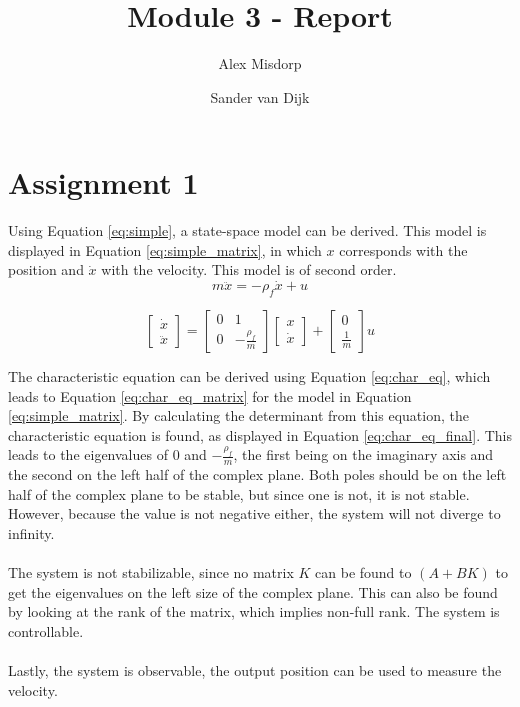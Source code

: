 \documentclass[final]{scrreprt} %
\title{Module 3 - Report}
\author{Alex {Misdorp} \and Sander {van Dijk}}
\begin{document}
\chapter{Assignment 1}
Using Equation \ref{eq:simple}, a state-space model can be derived. This model is displayed in Equation \ref{eq:simple_matrix}, in which $x$ corresponds with the position and $\dot{x}$ with the velocity. This model is of second order.
\begin{equation}
	m \ddot{x} = -\rho_f \dot{x} + u
	\label{eq:simple}
\end{equation}

\begin{equation}
	\begin{bmatrix}
		\dot{x} \\
		\ddot{x}
	\end{bmatrix} =
	\begin{bmatrix}
		0 & 1 \\
		0 & -\frac{\rho_f}{m}
	\end{bmatrix}
	\begin{bmatrix}
		x \\
		\dot{x}
	\end{bmatrix} +
	\begin{bmatrix}
		0 \\
		\frac{1}{m}
	\end{bmatrix}
	u
	\label{eq:simple_matrix}
\end{equation}

The characteristic equation can be derived using Equation \ref{eq:char_eq}, which leads to Equation \ref{eq:char_eq_matrix} for the model in Equation \ref{eq:simple_matrix}. By calculating the determinant from this equation, the characteristic equation is found, as displayed in Equation \ref{eq:char_eq_final}. This leads to the eigenvalues of $0$ and $-\frac{\rho_f}{m}$, the first being on the imaginary axis and the second on the left half of the complex plane. Both poles should be on the left half of the complex plane to be stable, but since one is not, it is not stable. However, because the value is not negative either, the system will not diverge to infinity.
\\ \\
The system is not stabilizable, since no matrix $K$ can be found to $(A + BK)$ to get the eigenvalues on the left size of the complex plane. This can also be found by looking at the rank of the matrix, which implies non-full rank. The system is controllable.
\\ \\
Lastly, the system is observable, the output position can be used to measure the velocity.
\end{document}
